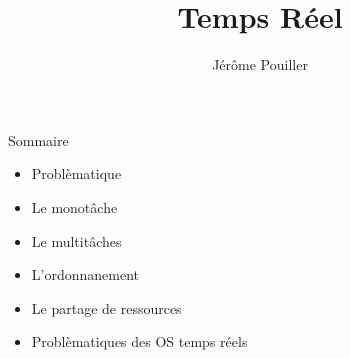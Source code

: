 \documentclass[10pt,ucs,usepdftitle=false]{beamer}
\title{Temps Réel}
\author[Sysmic - J. Pouiller]{Jérôme Pouiller \email{j.pouiller@sysmic.org}}
\institute[Sysmic]{}
\date{}
\begin{document}
  \begin{frame}[plain]
    \maketitle
  \end{frame}

  \begin{frame}{Sommaire}
    \begin{itemize} 
    \item Problèmatique
    \item Le monotâche
    \item Le multitâches
    \item L'ordonnanement
    \item Le partage de ressources
    \item Problèmatiques des OS temps réels
    \end{itemize} 
  \end{frame}
  
  
  
  
  
  
  
\end{document}
